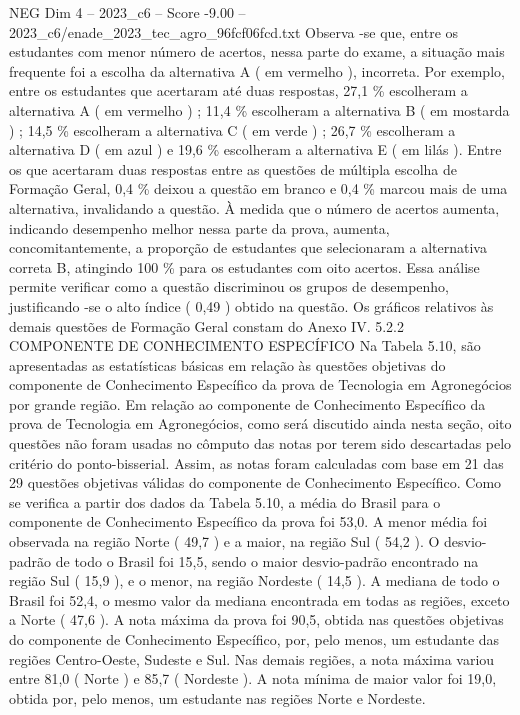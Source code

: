 \begin{textsample}{NEG Dim 4 – 2023\_c6 – Score -9.00 – 2023\_c6/enade\_2023\_tec\_agro\_96fcf06fcd.txt}
Observa -se que, entre os estudantes com menor número de acertos, nessa parte do exame, a situação mais frequente foi a escolha da alternativa A ( em vermelho ), incorreta.
Por exemplo, entre os estudantes que acertaram até duas respostas, 27,1 \% escolheram a alternativa A ( em vermelho ) ; 11,4 \% escolheram a alternativa B ( em mostarda ) ; 14,5 \% escolheram a alternativa C ( em verde ) ; 26,7 \% escolheram a alternativa D ( em azul ) e 19,6 \% escolheram a alternativa E ( em lilás ).
Entre os que acertaram duas respostas entre as questões de múltipla escolha de Formação Geral, 0,4 \% deixou a questão em branco e 0,4 \% marcou mais de uma alternativa, invalidando a questão.
À medida que o número de acertos aumenta, indicando desempenho melhor nessa parte da prova, aumenta, concomitantemente, a proporção de estudantes que selecionaram a alternativa correta B, atingindo 100 \% para os estudantes com oito acertos.
Essa análise permite verificar como a questão discriminou os grupos de desempenho, justificando -se o alto índice ( 0,49 ) obtido na questão.
Os gráficos relativos às demais questões de Formação Geral constam do Anexo IV. 5.2.2 COMPONENTE DE CONHECIMENTO ESPECÍFICO Na Tabela 5.10, são apresentadas as estatísticas básicas em relação às questões objetivas do componente de Conhecimento Específico da prova de Tecnologia em Agronegócios por grande região.
Em relação ao componente de Conhecimento Específico da prova de Tecnologia em Agronegócios, como será discutido ainda nesta seção, oito questões não foram usadas no cômputo das notas por terem sido descartadas pelo critério do ponto-bisserial.
Assim, as notas foram calculadas com base em 21 das 29 questões objetivas válidas do componente de Conhecimento Específico.
Como se verifica a partir dos dados da Tabela 5.10, a média do Brasil para o componente de Conhecimento Específico da prova foi 53,0.
A menor média foi observada na região Norte ( 49,7 ) e a maior, na região Sul ( 54,2 ).
O desvio-padrão de todo o Brasil foi 15,5, sendo o maior desvio-padrão encontrado na região Sul ( 15,9 ), e o menor, na região Nordeste ( 14,5 ).
A mediana de todo o Brasil foi 52,4, o mesmo valor da mediana encontrada em todas as regiões, exceto a Norte ( 47,6 ).
A nota máxima da prova foi 90,5, obtida nas questões objetivas do componente de Conhecimento Específico, por, pelo menos, um estudante das regiões Centro-Oeste, Sudeste e Sul.
Nas demais regiões, a nota máxima variou entre 81,0 ( Norte ) e 85,7 ( Nordeste ).
A nota mínima de maior valor foi 19,0, obtida por, pelo menos, um estudante nas regiões Norte e Nordeste.

\end{textsample}
